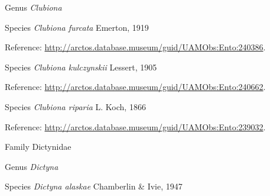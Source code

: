 \documentclass[9pt, article]{memoir}
\begin{document}
\begin{multicols}{2}
\vspace{6pt}\noindent\hspace{30pt}Genus \textit{Clubiona}


\vspace{6pt}\noindent\hspace{36pt}Species \textit{Clubiona furcata} Emerton, 1919


\vspace{6pt}Reference: 
\url{http://arctos.database.museum/guid/UAMObs:Ento:240386}.

\vspace{6pt}\noindent\hspace{36pt}Species \textit{Clubiona kulczynskii} Lessert, 1905


\vspace{6pt}Reference: 
\url{http://arctos.database.museum/guid/UAMObs:Ento:240662}.

\vspace{6pt}\noindent\hspace{36pt}Species \textit{Clubiona riparia} L. Koch, 1866


\vspace{6pt}Reference: 
\url{http://arctos.database.museum/guid/UAMObs:Ento:239032}.

\vspace{6pt}\noindent\hspace{24pt}Family Dictynidae


\vspace{6pt}\noindent\hspace{30pt}Genus \textit{Dictyna}


\vspace{6pt}\noindent\hspace{36pt}Species \textit{Dictyna alaskae} Chamberlin \& Ivie, 1947



\end{multicols}
\end{document}
